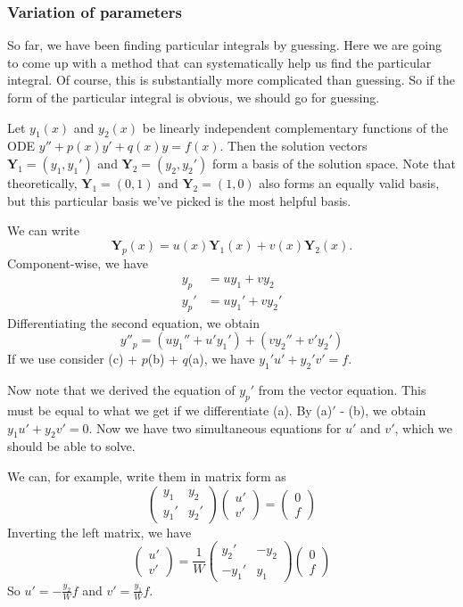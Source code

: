 \documentclass[a4paper]{article}
\begin{document}
\subsubsection{Variation of parameters}
So far, we have been finding particular integrals by guessing. Here we are going to come up with a method that can systematically help us find the particular integral. Of course, this is substantially more complicated than guessing. So if the form of the particular integral is obvious, we should go for guessing.

Let $y_1(x)$ and $y_2(x)$ be linearly independent complementary functions of the ODE $y'' + p(x)y' + q(x)y = f(x)$. Then the solution vectors $\mathbf{Y}_1 = (y_1, y_1')$ and $\mathbf{Y}_2 = (y_2, y_2')$ form a basis of the solution space. Note that theoretically, $\mathbf{Y}_1 = (0, 1)$ and $\mathbf{Y}_2 = (1, 0)$ also forms an equally valid basis, but this particular basis we've picked is the most helpful basis.

We can write
\[
  \mathbf{Y}_p(x) = u(x)\mathbf{Y}_1(x) + v(x)\mathbf{Y}_2(x).
\]
Component-wise, we have
\begin{align*}
  y_p &= uy_1 + vy_2 \tag{a}\\
  y_p' &= uy_1' + vy_2' \tag{b}
\end{align*}
Differentiating the second equation, we obtain
\[
  y''_p  = (uy_1'' + u'y_1') + (vy_2'' + v'y_2') \tag{c}
\]
If we use consider (c) + $p$(b) + $q$(a), we have $y_1' u' + y_2'v' = f$.

Now note that we derived the equation of $y_p'$ from the vector equation. This must be equal to what we get if we differentiate (a). By (a)$'$ - (b), we obtain $y_1u' + y_2v' = 0$. Now we have two simultaneous equations for $u'$ and $v'$, which we should be able to solve.

We can, for example, write them in matrix form as
\[
  \begin{pmatrix}
    y_1 & y_2\\
    y_1' & y_2'
  \end{pmatrix}
  \begin{pmatrix}
    u'\\
    v'
  \end{pmatrix}
  =
  \begin{pmatrix}
    0\\
    f
  \end{pmatrix}
\]
Inverting the left matrix, we have
\[
  \begin{pmatrix}
    u'\\
    v'
  \end{pmatrix} = \frac{1}{W}
  \begin{pmatrix}
    y_2' & -y_2\\
    -y_1' & y_1
  \end{pmatrix}
  \begin{pmatrix}
    0\\f
  \end{pmatrix}
\]
So $u' = -\frac{y_2}{W}f$ and $v' = \frac{y_1}{W}f$.
\end{document}

